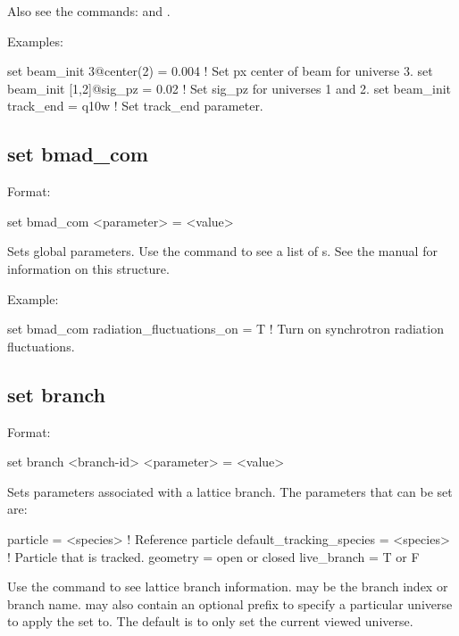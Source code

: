 {{Also see the commands:  and .

Examples:
\begin{example}
  set beam_init 3@center(2) = 0.004   ! Set px center of beam for universe 3.
  set beam_init [1,2]@sig_pz = 0.02   ! Set sig_pz for universes 1 and 2.
  set beam_init track_end = q10w      ! Set track_end parameter.
\end{example}


\subsection{set bmad_com}
\label{s:set.bmad.com}

Format:
\begin{example}
  set bmad_com <parameter> = <value>
\end{example}

Sets global \bmad parameters. Use the  command to see a list of
s. See the \bmad manual for information on this structure.

Example:
\begin{example}
  set bmad_com radiation_fluctuations_on = T ! Turn on synchrotron radiation fluctuations.
\end{example}


\subsection{set branch}
\label{s:set.branch}

Format:
\begin{example}
  set branch <branch-id> <parameter> = <value>
\end{example}

Sets parameters associated with a lattice branch. The parameters that can be set are:
\begin{example}
  particle                  = <species>   ! Reference particle
  default_tracking_species  = <species>   ! Particle that is tracked.
  geometry                  = open or closed
  live_branch               = T or F
\end{example}
Use the  command to see lattice branch information.  may be the
branch index or branch name.  may also contain an optional  prefix to
specify a particular universe to apply the set to. The default is to only set the current viewed
universe.

}}
